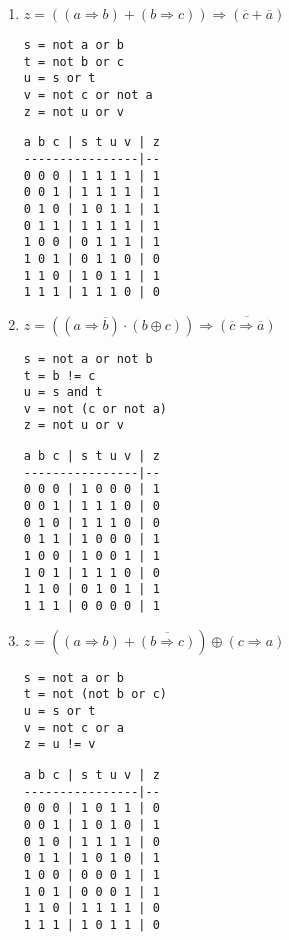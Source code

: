 \documentclass[11pt,a4paper]{article}
\begin{document}
\begin{enumerate}
\item $z = ((a \Rightarrow b) + (b \Rightarrow c)) \Rightarrow (\overline{c} + \overline{a})$
\hfill
\begin{minipage}[t]{4cm}\footnotesize
\begin{Verbatim}
s = not a or b
t = not b or c
u = s or t
v = not c or not a
z = not u or v
\end{Verbatim}
\end{minipage}
\hspace*{3mm}
\begin{minipage}[t]{3.5cm}\footnotesize
\begin{Verbatim}
a b c | s t u v | z
----------------|--
0 0 0 | 1 1 1 1 | 1
0 0 1 | 1 1 1 1 | 1
0 1 0 | 1 0 1 1 | 1
0 1 1 | 1 1 1 1 | 1
1 0 0 | 0 1 1 1 | 1
1 0 1 | 0 1 1 0 | 0
1 1 0 | 1 0 1 1 | 1
1 1 1 | 1 1 1 0 | 0
\end{Verbatim}
\end{minipage}
\vspace*{3mm}

\item $z = ((a \Rightarrow \overline{b}) \cdot (b \oplus c)) \Rightarrow \overline{(\overline{c} \Rightarrow \overline{a})}$
\hfill
\begin{minipage}[t]{4cm}\footnotesize
\begin{Verbatim}
s = not a or not b
t = b != c
u = s and t
v = not (c or not a)
z = not u or v
\end{Verbatim}
\end{minipage}
\hspace*{3mm}
\begin{minipage}[t]{3.5cm}\footnotesize
\begin{Verbatim}
a b c | s t u v | z
----------------|--
0 0 0 | 1 0 0 0 | 1
0 0 1 | 1 1 1 0 | 0
0 1 0 | 1 1 1 0 | 0
0 1 1 | 1 0 0 0 | 1
1 0 0 | 1 0 0 1 | 1
1 0 1 | 1 1 1 0 | 0
1 1 0 | 0 1 0 1 | 1
1 1 1 | 0 0 0 0 | 1
\end{Verbatim}
\end{minipage}
\vspace*{3mm}

\item $z = (({a} \Rightarrow {b}) + \overline{(b \Rightarrow c)}) \oplus ({c} \Rightarrow {a})$
\hfill
\begin{minipage}[t]{4cm}\footnotesize
\begin{Verbatim}
s = not a or b
t = not (not b or c)
u = s or t
v = not c or a
z = u != v
\end{Verbatim}
\end{minipage}
\hspace*{3mm}
\begin{minipage}[t]{3.5cm}\footnotesize
\begin{Verbatim}
a b c | s t u v | z
----------------|--
0 0 0 | 1 0 1 1 | 0
0 0 1 | 1 0 1 0 | 1
0 1 0 | 1 1 1 1 | 0
0 1 1 | 1 0 1 0 | 1
1 0 0 | 0 0 0 1 | 1
1 0 1 | 0 0 0 1 | 1
1 1 0 | 1 1 1 1 | 0
1 1 1 | 1 0 1 1 | 0
\end{Verbatim}
\end{minipage}
\vspace*{3mm}


\end{enumerate}
\end{document}
